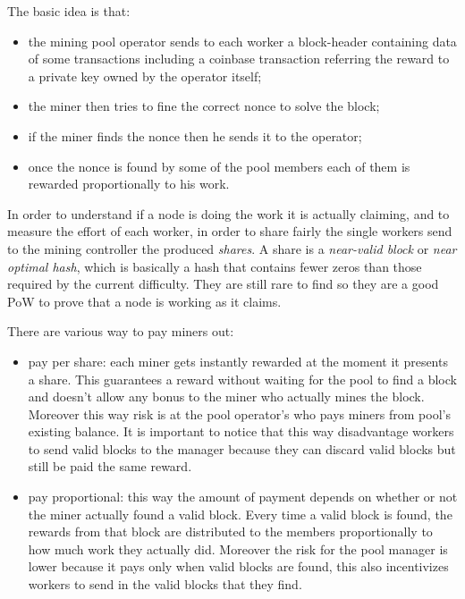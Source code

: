 The basic idea is that:
\begin{itemize}
    \item the mining pool operator sends to each worker a block-header containing data of some transactions including a coinbase transaction referring the reward to a private key owned by the operator itself;
    \item the miner then tries to fine the correct nonce to solve the block;
    \item if the miner finds the nonce then he sends it to the operator;
    \item once the nonce is found by some of the pool members each of them is rewarded proportionally to his work.
\end{itemize}

In order to understand if a node is doing the work it is actually claiming, and to measure the effort of each worker, in order to share fairly the single workers send to the mining controller the produced \emph{shares}.
A share is a \emph{near-valid block} or \emph{near optimal hash}, which is basically a hash that contains fewer zeros than those required by the current difficulty.
They are still rare to find so they are a good PoW to prove that a node is working as it claims.

There are various way to pay miners out:
\begin{itemize}
    \item pay per share: each miner gets instantly rewarded at the moment it presents a share.
    This guarantees a reward without waiting for the pool to find a block and doesn't allow any bonus to the miner who actually mines the block.
    Moreover this way risk is at the pool operator's who pays miners from pool's existing balance.
    It is important to notice that this way disadvantage workers to send valid blocks to the manager because they can discard valid blocks but still be paid the same reward.

    \item pay proportional: this way the amount of payment depends on whether or not the miner actually found a valid block.
    Every time a valid block is found, the rewards from that block are distributed to the members proportionally to how much work they actually did.
    Moreover the risk for the pool manager is lower because it pays only when valid blocks are found, this also incentivizes workers to send in the valid blocks that they find.    
\end{itemize}

